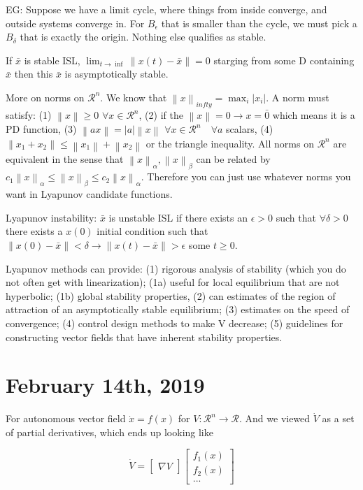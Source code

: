 \documentclass[11pt]{article}
\newcommand{\norm}[1]{\left\lVert#1\right\rVert}
\begin{document}
 EG: Suppose we have a limit cycle, where things from inside converge, and outside systems converge in. For $B_\epsilon$ that is smaller than the cycle, we must pick a $B_\delta$ that is exactly the origin.  Nothing else qualifies as stable.

 If $\bar{x}$ is stable ISL, $\lim_{t\rightarrow \inf} \norm{x(t) - \bar{x}} = 0$ starging from some D containing $\bar{x}$  then this $\bar{x}$ is asymptotically stable.

More on norms on $\mathcal{R}^n$. We know that $\norm{x}_{infty} = \max_i \rvert x_i \rvert$. A norm must satisfy: (1) $\norm{x}\geq 0$ $\forall x \in \mathcal{R}^n$, (2) if the $\norm{x} =  0 \rightarrow x = \bar{0}$ which means it is a PD function, (3) $\norm{ax} = \rvert a \rvert \norm{x}$ $\forall x \in \mathcal{R}^n \quad \forall a$ scalars, (4) $\norm{x_1 + x_2} \leq \norm{x_1} + \norm{x_2}$ or the triangle inequality. All norms on $\mathcal{R}^n$ are equivalent in the sense that $\norm{x}_\alpha, \norm{x}_\beta$ can be related by $c_1 \norm{x}_\alpha \leq \norm{x}_\beta \leq c_2 \norm{x}_\alpha$. Therefore you can just use whatever norms you want in Lyapunov candidate functions. 

Lyapunov instability: $\bar{x}$ is unstable ISL if there exists an $\epsilon > 0$ such that $\forall \delta >0$  there exists a $x(0)$ initial condition such that $\norm{x(0) - \bar{x}}<\delta \rightarrow \norm{x(t) - \bar{x}} > \epsilon$ some $t\geq 0$. 

Lyapunov methods can provide: (1) rigorous analysis of stability (which you do not often get with linearization); (1a) useful for local equilibrium that are not hyperbolic; (1b) global stability properties, (2) can estimates of the region of attraction of an asymptotically stable equilibrium; (3) estimates on the speed of convergence; (4) control design methods to make V decrease; (5) guidelines for constructing vector fields that have inherent stability properties.




\section*{February 14th, 2019}
For autonomous vector field $\dot{x}=f(x)$ for $V:\mathcal{R}^n \rightarrow \mathcal{R}$. And we viewed $\dot{V}$ as a set of partial derivatives, which ends up looking like

\begin{equation}
\dot{V}=
\begin{bmatrix}
\nabla V
\end{bmatrix}
\begin{bmatrix}
f_1(x) \\
f_2(x) \\
...
\end{bmatrix}
\end{equation}
\end{document}
